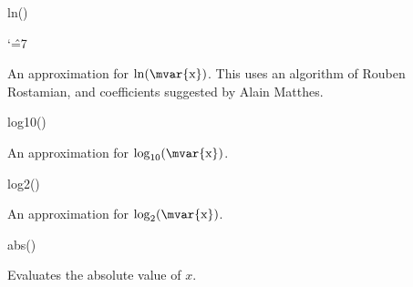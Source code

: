 \begin{math-function}{ln()}
\mathcommand

{
\catcode`\^=7

	An approximation for $\ln(\textrm{\mvar{x}})$.
	This uses an algorithm of Rouben Rostamian, and coefficients
	suggested by Alain Matthes.
}	
\begin{codeexample}[]
 \pgfmathresult
\end{codeexample}

\begin{codeexample}[]
 \pgfmathresult
\end{codeexample}

\end{math-function}

\begin{math-function}{log10()}

	An approximation for $\log_{10}(\textrm{\mvar{x}})$.

\begin{codeexample}[]
 \pgfmathresult
\end{codeexample}

\end{math-function}

\begin{math-function}{log2()}

	An approximation for $\log_2(\textrm{\mvar{x}})$.

\begin{codeexample}[]
 \pgfmathresult
\end{codeexample}

\end{math-function}

\begin{math-function}{abs()}
\mathcommand

	Evaluates the absolute value of $x$.
	
\begin{codeexample}[]
 \pgfmathresult
\end{codeexample}

\begin{codeexample}[]
 \pgfmathresult
\end{codeexample}
\end{math-function}

